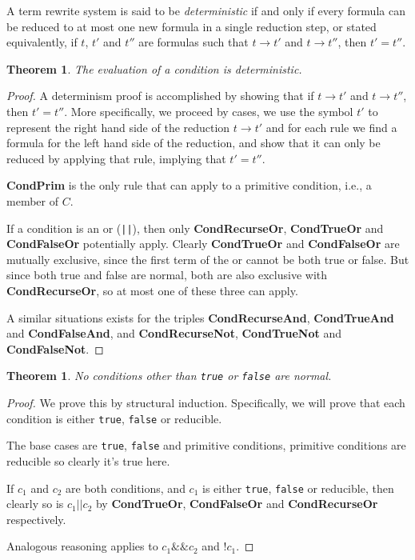 \documentclass[11pt]{article}
\begin{document}
A term rewrite system is said to be \emph{deterministic} if and only if every formula can be reduced to at most one new formula in a single reduction step, or stated equivalently, if $t$, $t'$ and $t''$ are formulas such that $t \rightarrow t'$ and $t \rightarrow t''$, then $t' = t''$.

\newtheorem*{conditiondeterminism}{Theorem}
\begin{conditiondeterminism}
The evaluation of a condition is deterministic.
\end{conditiondeterminism}

\begin{proof}

A determinism proof is accomplished by showing that if $t \rightarrow t'$ and $t \rightarrow t''$, then $t' = t''$.  More specifically, we proceed by cases, we use the symbol $t'$ to represent the right hand side of the reduction $t \rightarrow t'$ and for each rule we find a formula for the left hand side of the reduction, and show that it can only be reduced by applying that rule, implying that $t' = t''$.

\textbf{CondPrim} is the only rule that can apply to a primitive condition, i.e., a member of $C$.

If a condition is an or (\texttt{||}), then only \textbf{CondRecurseOr}, \textbf{CondTrueOr} and \textbf{CondFalseOr} potentially apply.  Clearly \textbf{CondTrueOr} and \textbf{CondFalseOr} are mutually exclusive, since the first term of the or cannot be both true or false.  But since both true and false are normal, both are also exclusive with \textbf{CondRecurseOr}, so at most one of these three can apply.

A similar situations exists for the triples \textbf{CondRecurseAnd}, \textbf{CondTrueAnd} and \textbf{CondFalseAnd}, and \textbf{CondRecurseNot}, \textbf{CondTrueNot} and \textbf{CondFalseNot}.

\end{proof}

\newtheorem*{truefalseareuniquelynormal}{Theorem}
\begin{truefalseareuniquelynormal}
No conditions other than \texttt{true} or \texttt{false} are normal.
\end{truefalseareuniquelynormal}

\begin{proof}
We prove this by structural induction.  Specifically, we will prove that each condition is either \texttt{true}, \texttt{false} or reducible.

The base cases are \texttt{true}, \texttt{false} and primitive conditions, primitive conditions are reducible so clearly it's true here.

If $c_{1}$ and $c_{2}$ are both conditions, and $c_{1}$ is either \texttt{true}, \texttt{false} or reducible, then clearly so is $c_{1}\texttt{||}c_{2}$ by \textbf{CondTrueOr}, \textbf{CondFalseOr} and \textbf{CondRecurseOr} respectively.

Analogous reasoning applies to $c_{1}\texttt{\&\&}c_{2}$ and $\texttt{!}c_{1}$.
\end{proof}
\end{document}
